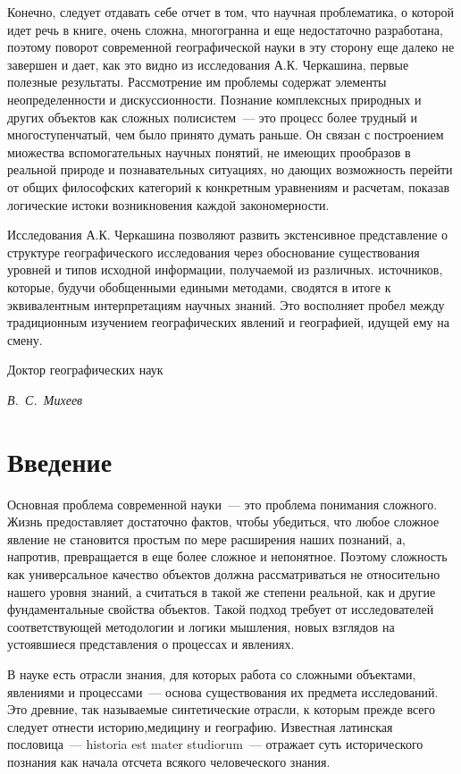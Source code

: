 \documentclass[draft,openany,14pt]{extbook}
\begin{document}
Конечно, следует отдавать себе отчет в том, что научная проблематика, о которой идет речь в книге, очень сложна, многогранна и еще недостаточно разработана, поэтому поворот современной географической науки в эту сторону еще далеко не завершен и дает, как это видно из исследования А.К. Черкашина, первые полезные результаты. Рассмотрение им проблемы содержат элементы неопределенности и дискуссионности. Познание комплексных природных и других объектов как сложных полисистем~--- это процесс более трудный и многоступенчатый, чем было принято думать раньше. Он связан с построением миожества вспомогательных научных понятий, не имеющих прообразов в реальной природе и познавательных ситуациях, но дающих возможность перейти от общих философских категорий к конкретным уравнениям и расчетам, показав логические истоки возникновения каждой закономерности.

Исследования А.К. Черкашина позволяют развить экстенсивное представление о структуре географического исследования через обоснование существования уровней и типов исходной информации, получаемой из различных. источников, которые, будучи обобщенными едиными методами, сводятся в итоге к эквивалентным интерпретациям научных знаний. Это восполняет пробел между традиционным изучением географических явлений и географией, идущей ему на смену.

\begin{flushright}
\small{}
Доктор географических наук\par{}
\itshape{}
В.~С.~Михеев
\end{flushright}

\chapter*{Введение}

Основная проблема современной науки~--- это проблема понимания сложного. Жизнь предоставляет достаточно фактов, чтобы убедиться, что любое сложное явление не становится простым по мере расширения наших познаний, а, напротив, превращается в еще более сложное и непонятное. Поэтому сложность как универсальное качество объектов должна рассматриваться не относительно нашего уровня знаний, а считаться в такой же степени реальной, как и другие фундаментальные свойства объектов. Такой подход требует от исследователей соответствующей методологии и логики мышления, новых взглядов на устоявшиеся представления о процессах и явлениях.

В науке есть отрасли знания, для которых работа со сложными объектами, явлениями и процессами~--- основа существования их предмета исследований. Это древние, так называемые синтетические отрасли, к которым прежде всего следует отнести историю,медицину и географию. Известная латинская пословица~--- historia est mater studiorum~--- отражает суть исторического познания как начала отсчета всякого человеческого знания.
\end{document}
